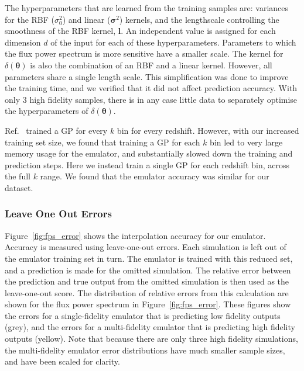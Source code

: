 \documentclass[a4paper,11pt]{article}
\begin{document}
The hyperparameters that are learned from the training samples are: variances for the RBF ($\sigma_0^2$) and  linear ($\boldsymbol{\sigma}^2$) kernels, and the lengthscale controlling the smoothness of the RBF kernel, $\boldsymbol{l}$. An independent value is assigned for each dimension $d$ of the input for each of these hyperparameters. Parameters to which the flux power spectrum is more sensitive have a smaller scale. The kernel for $\delta(\boldsymbol{\theta})$ is also the combination of an RBF and a linear kernel. However, all parameters share a single length scale. This simplification was done to improve the training time, and we verified that it did not affect prediction accuracy. With only $3$ high fidelity samples, there is in any case little data to separately optimise the hyperparameters of $\delta(\boldsymbol{\theta})$.

Ref.~\cite{Fernandez:2022} trained a GP for every $k$ bin for every redshift. However, with our increased training set size, we found that training a GP for each $k$ bin led to very large memory usage for the emulator, and substantially slowed down the training and prediction steps. Here we instead train a single GP for each redshift bin, across the full $k$ range. We found that the emulator accuracy was similar for our dataset.


\subsubsection{Leave One Out Errors}

Figure~\ref{fig:fps_error} shows the interpolation accuracy for our emulator. Accuracy is measured using leave-one-out errors. Each simulation is left out of the emulator training set in turn. The emulator is trained with this reduced set, and a prediction is made for the omitted simulation. The relative error between the prediction and true output from the omitted simulation is then used as the leave-one-out score.
The distribution of relative errors from this calculation are shown for the flux power spectrum in Figure~\ref{fig:fps_error}.
These figures show the errors for a single-fidelity emulator that is predicting low fidelity outputs (grey), and the errors for a multi-fidelity emulator that is predicting high fidelity outputs (yellow). Note that because there are only three high fidelity simulations, the multi-fidelity emulator error distributions have much smaller sample sizes, and have been scaled for clarity.
\end{document}
